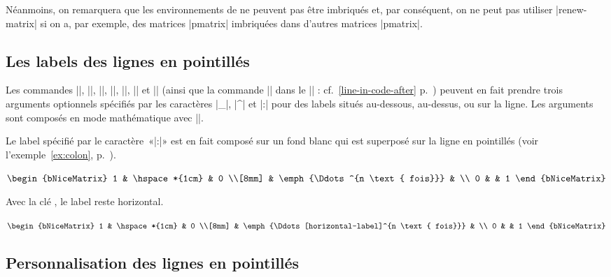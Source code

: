 \documentclass[dvipsnames]{article}
\begin{document}
\bigskip
Néanmoins, on remarquera que les environnements de  ne peuvent
pas être imbriqués et, par conséquent, on ne peut pas utiliser |renew-matrix| si
on a, par exemple, des matrices |{pmatrix}| imbriquées dans d'autres matrices
|{pmatrix}|.


\subsection{Les labels des lignes en pointillés}

Les commandes |\Ldots|, |\Cdots|, |\Vdots|, |\Ddots|, |\Iddots|, |\Hdotsfor| et
|\Vdotsfor| (ainsi que la commande |\line| dans le |\CodeAfter| :
cf.~\ref{line-in-code-after} p.~\pageref{line-in-code-after}) peuvent en fait
prendre trois arguments optionnels spécifiés par les caractères |_|, |^| et |:|
pour des labels situés au-dessous, au-dessus, ou sur la ligne. Les arguments
sont composés en mode mathématique avec |\scriptstyle|.

\smallskip
Le label spécifié par le caractère~«|:|» est en fait composé sur un fond blanc
qui est superposé sur la ligne en pointillés (voir l'exemple~\ref{ex:colon},
p.~\pageref{ex:colon}).

\bigskip
\begin{Code}[width=11cm,show-output]
$\begin{bNiceMatrix}
1 & \hspace*{1cm}           & 0 \\[8mm]
  & \emph{\Ddots^{n \text{ fois}}} &    \\
0 &                         & 1
\end{bNiceMatrix}$
\end{Code}


\bigskip
Avec la clé , le label reste horizontal.

\nobreak
\smallskip
\begin{Code}[width=11cm,show-output]
$\begin{bNiceMatrix}
1 & \hspace*{1cm}           & 0 \\[8mm]
  & \emph{\Ddots[horizontal-label]^{n \text{ fois}}} & \\
0 &                         & 1
\end{bNiceMatrix}$
\end{Code}


\subsection{Personnalisation des lignes en pointillés}
\end{document}
